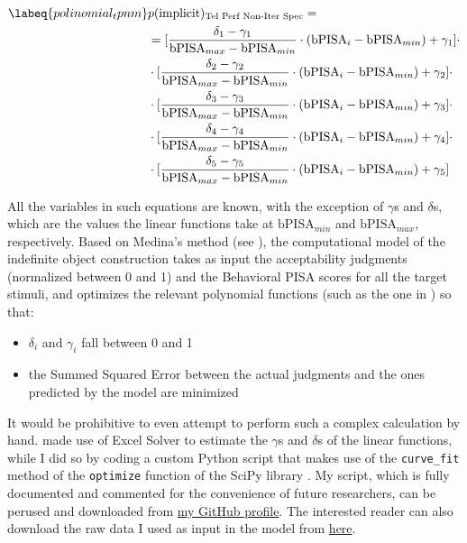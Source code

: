 \begin{align}  \labeq{polinomial_tpnm}
    & p(\text{implicit})\textsubscript{Tel Perf Non-Iter Spec} = \nonumber \\ & = [\frac{\delta_1 - \gamma_1}{\textrm{bPISA}_{max} - \textrm{bPISA}_{min}} \cdot ({\textrm{bPISA}_{i} - \textrm{bPISA}_{min}}) + \gamma_1] \cdot \nonumber \\ & \cdot [\frac{\delta_2 - \gamma_2}{\textrm{bPISA}_{max} - \textrm{bPISA}_{min}} \cdot ({\textrm{bPISA}_{i} - \textrm{bPISA}_{min}}) + \gamma_2] \cdot \nonumber \\ & \cdot [\frac{\delta_3 - \gamma_3}{\textrm{bPISA}_{max} - \textrm{bPISA}_{min}} \cdot ({\textrm{bPISA}_{i} - \textrm{bPISA}_{min}}) + \gamma_3] \cdot \nonumber \\ & \cdot [\frac{\delta_4 - \gamma_4}{\textrm{bPISA}_{max} - \textrm{bPISA}_{min}} \cdot ({\textrm{bPISA}_{i} - \textrm{bPISA}_{min}}) + \gamma_4] \cdot \nonumber \\ & \cdot [\frac{\delta_5 - \gamma_5}{\textrm{bPISA}_{max} - \textrm{bPISA}_{min}} \cdot ({\textrm{bPISA}_{i} - \textrm{bPISA}_{min}}) + \gamma_5]
\end{align}

All the variables in such equations are known, with the exception of $\gamma$s and $\delta$s, which are the values the linear functions take at $\textrm{bPISA}_{min}$ and $\textrm{bPISA}_{max}$, respectively. Based on Medina's method (see ), the computational model of the indefinite object construction takes as input the acceptability judgments (normalized between 0 and 1) and the Behavioral PISA scores for all the target stimuli, and optimizes the relevant polynomial functions (such as the one in ) so that:

\begin{itemize}
    \item $\delta_i$ and $\gamma_i$ fall between 0 and 1
    \item the Summed Squared Error between the actual judgments and the ones predicted by the model are minimized
\end{itemize}

It would be prohibitive to even attempt to perform such a complex calculation by hand. \textcite[135]{Medina2007} made use of Excel Solver to estimate the $\gamma$s and $\delta$s of the linear functions, while I did so by coding a custom Python script that makes use of the \texttt{curve\_fit} method of the \texttt{optimize} function of the SciPy library \parencite{2020SciPy-NMeth}. My script, which is fully documented and commented for the convenience of future researchers, can be perused and downloaded from \href{https://github.com/giuliacappelli/MedinaStochasticOptimalityTheory}{my GitHub profile}. The interested reader can also download the raw data I used as input in the model from \href{https://github.com/giuliacappelli/dissertationData}{here}.



